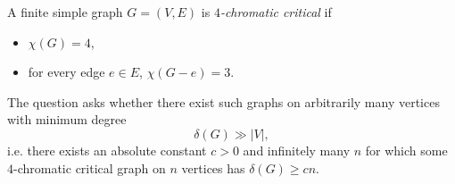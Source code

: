 A finite simple graph $G=(V,E)$ is \emph{$4$-chromatic critical} if
\begin{itemize}
\item $\chi(G)=4$,
\item for every edge $e\in E$, $\chi(G-e)=3$.
\end{itemize}
The question asks whether there exist such graphs on arbitrarily many vertices with minimum degree
\[\delta(G) \gg |V|,\]
i.e. there exists an absolute constant $c>0$ and infinitely many $n$ for which some $4$-chromatic critical graph on $n$ vertices has $\delta(G)\ge cn$.
